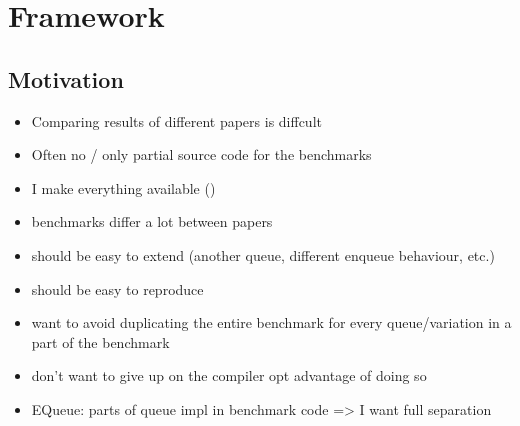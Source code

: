 \section{Framework}
\subsection{Motivation}
\begin{itemize}
    \item Comparing results of different papers is diffcult
    \item Often no / only partial source code for the benchmarks
    \item I make everything available ()
    \item benchmarks differ a lot between papers

    \item should be easy to extend (another queue, different enqueue behaviour, etc.)
    \item should be easy to reproduce
    \item want to avoid duplicating the entire benchmark for every queue/variation in a part of the benchmark
    \item don't want to give up on the compiler opt advantage of doing so
    \item EQueue: parts of queue impl in benchmark code => I want full separation
\end{itemize}


